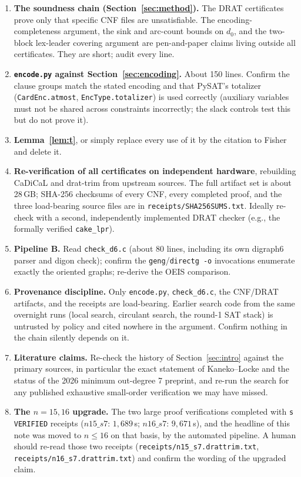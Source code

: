 \documentclass[11pt]{article}
\begin{document}
\begin{enumerate}
\item \textbf{The soundness chain (Section~\ref{sec:method}).} The DRAT
certificates prove only that specific CNF files are unsatisfiable. The
encoding-completeness argument, the sink and arc-count bounds on $d_0$,
and the two-block lex-leader covering argument are pen-and-paper claims
living outside all certificates. They are short; audit every line.
\item \textbf{\texttt{encode.py} against Section~\ref{sec:encoding}.}
About 150 lines. Confirm the clause groups match the stated encoding and
that PySAT's totalizer (\texttt{CardEnc.atmost}, \texttt{EncType.totalizer})
is used correctly (auxiliary variables must not be shared across
constraints incorrectly; the slack controls test this but do not prove it).
\item \textbf{Lemma~\ref{lem:t}}, or simply replace every use of it by the
citation to Fisher~\cite{Fisher96} and delete it.
\item \textbf{Re-verification of all certificates on independent hardware},
rebuilding CaDiCaL and drat-trim from upstream sources. The full artifact
set is about 28\,GB; SHA-256 checksums of every CNF, every completed proof,
and the three load-bearing source files are in
\texttt{receipts/SHA256SUMS.txt}. Ideally re-check with a second,
independently implemented DRAT checker (e.g., the formally verified
\texttt{cake\_lpr}).
\item \textbf{Pipeline B.} Read \texttt{check\_d6.c} (about 80 lines,
including its own digraph6 parser and digon check); confirm the
\texttt{geng}/\texttt{directg -o} invocations enumerate exactly the
oriented graphs; re-derive the OEIS comparison.
\item \textbf{Provenance discipline.} Only \texttt{encode.py},
\texttt{check\_d6.c}, the CNF/DRAT artifacts, and the receipts are
load-bearing. Earlier search code from the same overnight runs (local
search, circulant search, the round-1 SAT stack) is untrusted by policy
and cited nowhere in the argument. Confirm nothing in the chain silently
depends on it.
\item \textbf{Literature claims.} Re-check the history of
Section~\ref{sec:intro} against the primary sources, in particular the
exact statement of Kaneko--Locke and the status of the 2026 minimum
out-degree 7 preprint, and re-run the search for any published exhaustive
small-order verification we may have missed.
\item \textbf{The $n = 15, 16$ upgrade.} The two large proof
verifications completed with \texttt{s VERIFIED} receipts
($n15\_s7$: $1{,}689$\,s; $n16\_s7$: $9{,}671$\,s), and the headline of
this note was moved to $n \le 16$ on that basis, by the automated
pipeline. A human should re-read those two receipts
(\texttt{receipts/n15\_s7.drattrim.txt},
\texttt{receipts/n16\_s7.drattrim.txt}) and confirm the wording of the
upgraded claim.
\end{enumerate}
\end{document}
